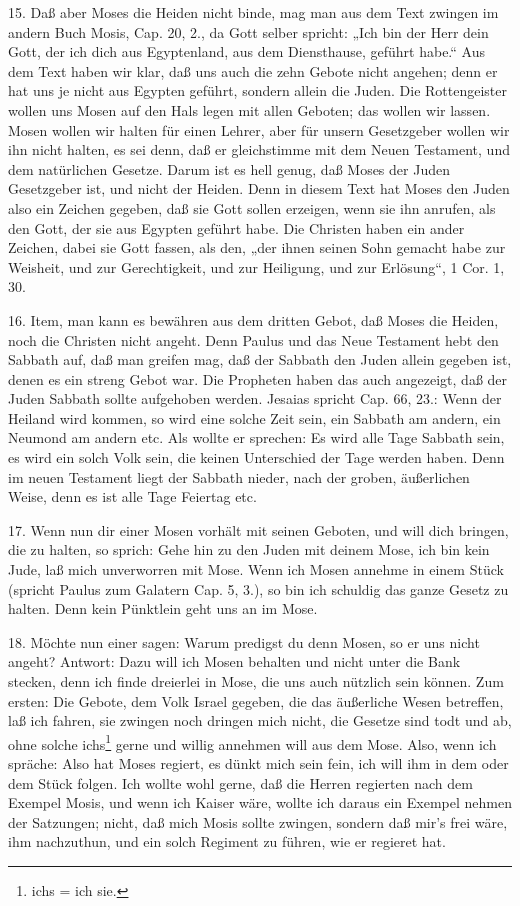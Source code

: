 15. Daß aber Moses die Heiden nicht binde, mag man aus dem Text zwingen im andern Buch Mosis, Cap. 20, 2., da Gott selber spricht: „Ich bin der Herr dein Gott, der ich dich aus Egyptenland, aus dem Diensthause, geführt habe.“ Aus dem Text haben wir klar, daß uns auch die zehn Gebote nicht angehen; denn er hat uns je nicht aus Egypten geführt, sondern allein die Juden. Die Rottengeister wollen uns Mosen auf den Hals legen mit allen Geboten; das wollen wir lassen. Mosen wollen wir halten für einen Lehrer, aber für unsern Gesetzgeber wollen wir ihn nicht halten, es sei denn, daß er gleichstimme mit dem Neuen Testament, und dem natürlichen Gesetze. Darum ist es hell genug, daß Moses der Juden Gesetzgeber ist, und nicht der Heiden. Denn in diesem Text hat Moses den Juden also ein Zeichen gegeben, daß sie Gott sollen erzeigen, wenn sie ihn anrufen, als den Gott, der sie aus Egypten geführt habe. Die Christen haben ein ander Zeichen, dabei sie Gott fassen, als den, „der ihnen seinen Sohn gemacht habe zur Weisheit, und zur Gerechtigkeit, und zur Heiligung, und zur Erlösung“, 1 Cor. 1, 30.

16. Item, man kann es bewähren aus dem dritten Gebot, daß Moses die Heiden, noch die Christen nicht angeht. Denn Paulus und das Neue Testament hebt den Sabbath auf, daß man greifen mag, daß der Sabbath den Juden allein gegeben ist, denen es ein streng Gebot war. Die Propheten haben das auch angezeigt, daß der Juden Sabbath sollte aufgehoben werden. Jesaias spricht Cap. 66, 23.: Wenn der Heiland wird kommen, so wird eine solche Zeit sein, ein Sabbath am andern, ein Neumond am andern etc. Als wollte er sprechen: Es wird alle Tage Sabbath sein, es wird ein solch Volk sein, die keinen Unterschied der Tage werden haben. Denn im neuen Testament liegt der Sabbath nieder, nach der groben, äußerlichen Weise, denn es ist alle Tage Feiertag etc.

17. Wenn nun dir einer Mosen vorhält mit seinen Geboten, und will dich bringen, die zu halten, so sprich: Gehe hin zu den Juden mit deinem Mose, ich bin kein Jude, laß mich unverworren mit Mose. Wenn ich Mosen annehme in einem Stück (spricht Paulus zum Galatern Cap. 5, 3.), so bin ich schuldig das ganze Gesetz zu halten. Denn kein Pünktlein geht uns an im Mose.

18. Möchte nun einer sagen: Warum predigst du denn Mosen, so er uns nicht angeht? Antwort: Dazu will ich Mosen behalten und nicht unter die Bank stecken, denn ich finde dreierlei in Mose, die uns auch nützlich sein können. Zum ersten: Die Gebote, dem Volk Israel gegeben, die das äußerliche Wesen betreffen, laß ich fahren, sie zwingen noch dringen mich nicht, die Gesetze sind todt und ab, ohne solche ichs\footnote{ichs = ich sie.} gerne und willig annehmen will aus dem Mose. Also, wenn ich spräche: Also hat Moses regiert, es dünkt mich sein fein, ich will ihm in dem oder dem Stück folgen. Ich wollte wohl gerne, daß die Herren regierten nach dem Exempel Mosis, und wenn ich Kaiser wäre, wollte ich daraus ein Exempel nehmen der Satzungen; nicht, daß mich Mosis sollte zwingen, sondern daß mir’s frei wäre, ihm nachzuthun, und ein solch Regiment zu führen, wie er regieret hat.

